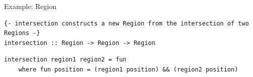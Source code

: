 \documentclass[8pt,aspectratio=169]{beamer}
\begin{document}
\begin{frame}[fragile]{Example: Region}
\vspace{3mm}

\setlength\partopsep{-\topsep}
\addtolength\partopsep{-\parskip}
\addtolength\partopsep{0.1cm}

\pause
\begin{verbatim}
{- intersection constructs a new Region from the intersection of two Regions -}
intersection :: Region -> Region -> Region
\end{verbatim}

\pause
\begin{verbatim}
intersection region1 region2 = fun
    where fun position = (region1 position) && (region2 position)
\end{verbatim}

\setlength\partopsep{2pt}

\end{frame}

\end{document}
